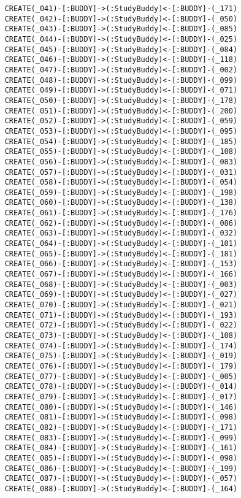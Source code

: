 \begin{lstlisting}
	CREATE(_041)-[:BUDDY]->(:StudyBuddy)<-[:BUDDY]-(_171)
	CREATE(_042)-[:BUDDY]->(:StudyBuddy)<-[:BUDDY]-(_050)
	CREATE(_043)-[:BUDDY]->(:StudyBuddy)<-[:BUDDY]-(_085)
	CREATE(_044)-[:BUDDY]->(:StudyBuddy)<-[:BUDDY]-(_025)
	CREATE(_045)-[:BUDDY]->(:StudyBuddy)<-[:BUDDY]-(_084)
	CREATE(_046)-[:BUDDY]->(:StudyBuddy)<-[:BUDDY]-(_118)
	CREATE(_047)-[:BUDDY]->(:StudyBuddy)<-[:BUDDY]-(_002)
	CREATE(_048)-[:BUDDY]->(:StudyBuddy)<-[:BUDDY]-(_099)
	CREATE(_049)-[:BUDDY]->(:StudyBuddy)<-[:BUDDY]-(_071)
	CREATE(_050)-[:BUDDY]->(:StudyBuddy)<-[:BUDDY]-(_178)
	CREATE(_051)-[:BUDDY]->(:StudyBuddy)<-[:BUDDY]-(_200)
	CREATE(_052)-[:BUDDY]->(:StudyBuddy)<-[:BUDDY]-(_059)
	CREATE(_053)-[:BUDDY]->(:StudyBuddy)<-[:BUDDY]-(_095)
	CREATE(_054)-[:BUDDY]->(:StudyBuddy)<-[:BUDDY]-(_185)
	CREATE(_055)-[:BUDDY]->(:StudyBuddy)<-[:BUDDY]-(_108)
	CREATE(_056)-[:BUDDY]->(:StudyBuddy)<-[:BUDDY]-(_083)
	CREATE(_057)-[:BUDDY]->(:StudyBuddy)<-[:BUDDY]-(_031)
	CREATE(_058)-[:BUDDY]->(:StudyBuddy)<-[:BUDDY]-(_054)
	CREATE(_059)-[:BUDDY]->(:StudyBuddy)<-[:BUDDY]-(_198)
	CREATE(_060)-[:BUDDY]->(:StudyBuddy)<-[:BUDDY]-(_138)
	CREATE(_061)-[:BUDDY]->(:StudyBuddy)<-[:BUDDY]-(_176)
	CREATE(_062)-[:BUDDY]->(:StudyBuddy)<-[:BUDDY]-(_086)
	CREATE(_063)-[:BUDDY]->(:StudyBuddy)<-[:BUDDY]-(_032)
	CREATE(_064)-[:BUDDY]->(:StudyBuddy)<-[:BUDDY]-(_101)
	CREATE(_065)-[:BUDDY]->(:StudyBuddy)<-[:BUDDY]-(_181)
	CREATE(_066)-[:BUDDY]->(:StudyBuddy)<-[:BUDDY]-(_153)
	CREATE(_067)-[:BUDDY]->(:StudyBuddy)<-[:BUDDY]-(_166)
	CREATE(_068)-[:BUDDY]->(:StudyBuddy)<-[:BUDDY]-(_003)
	CREATE(_069)-[:BUDDY]->(:StudyBuddy)<-[:BUDDY]-(_027)
	CREATE(_070)-[:BUDDY]->(:StudyBuddy)<-[:BUDDY]-(_021)
	CREATE(_071)-[:BUDDY]->(:StudyBuddy)<-[:BUDDY]-(_193)
	CREATE(_072)-[:BUDDY]->(:StudyBuddy)<-[:BUDDY]-(_022)
	CREATE(_073)-[:BUDDY]->(:StudyBuddy)<-[:BUDDY]-(_108)
	CREATE(_074)-[:BUDDY]->(:StudyBuddy)<-[:BUDDY]-(_174)
	CREATE(_075)-[:BUDDY]->(:StudyBuddy)<-[:BUDDY]-(_019)
	CREATE(_076)-[:BUDDY]->(:StudyBuddy)<-[:BUDDY]-(_179)
	CREATE(_077)-[:BUDDY]->(:StudyBuddy)<-[:BUDDY]-(_005)
	CREATE(_078)-[:BUDDY]->(:StudyBuddy)<-[:BUDDY]-(_014)
	CREATE(_079)-[:BUDDY]->(:StudyBuddy)<-[:BUDDY]-(_017)
	CREATE(_080)-[:BUDDY]->(:StudyBuddy)<-[:BUDDY]-(_146)
	CREATE(_081)-[:BUDDY]->(:StudyBuddy)<-[:BUDDY]-(_098)
	CREATE(_082)-[:BUDDY]->(:StudyBuddy)<-[:BUDDY]-(_171)
	CREATE(_083)-[:BUDDY]->(:StudyBuddy)<-[:BUDDY]-(_099)
	CREATE(_084)-[:BUDDY]->(:StudyBuddy)<-[:BUDDY]-(_161)
	CREATE(_085)-[:BUDDY]->(:StudyBuddy)<-[:BUDDY]-(_098)
	CREATE(_086)-[:BUDDY]->(:StudyBuddy)<-[:BUDDY]-(_199)
	CREATE(_087)-[:BUDDY]->(:StudyBuddy)<-[:BUDDY]-(_057)
	CREATE(_088)-[:BUDDY]->(:StudyBuddy)<-[:BUDDY]-(_164)

\end{lstlisting}
